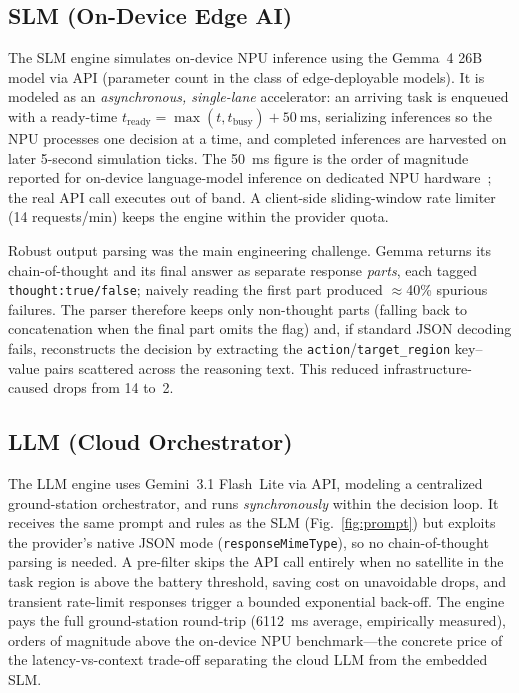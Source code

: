 \documentclass[conference,comsoc,twoside,caption=false]{IEEEtran}
\theoremstyle{definition}
\begin{document}
\subsection{SLM (On-Device Edge AI)}
The SLM engine simulates on-device NPU inference using the Gemma~4 26B model
via API (parameter count in the class of edge-deployable models). It is modeled
as an \emph{asynchronous, single-lane} accelerator: an arriving task is enqueued
with a ready-time $t_{\mathrm{ready}} = \max(t, t_{\mathrm{busy}}) + \SI{50}{\milli\second}$,
serializing inferences so the NPU processes one decision at a time, and completed
inferences are harvested on later 5-second simulation ticks. The
\SI{50}{\milli\second} figure is the order of magnitude reported for on-device
language-model inference on dedicated NPU hardware~\cite{wang2025}; the real API
call executes out of band. A client-side sliding-window rate limiter (14
requests/min) keeps the engine within the provider quota.

Robust output parsing was the main engineering challenge. Gemma returns its
chain-of-thought and its final answer as separate response \emph{parts}, each
tagged \texttt{thought:true/false}; naively reading the first part produced
$\approx$40\% spurious failures. The parser therefore keeps only non-thought
parts (falling back to concatenation when the final part omits the flag) and, if
standard JSON decoding fails, reconstructs the decision by extracting the
\texttt{action}/\texttt{target\_region} key--value pairs scattered across the
reasoning text. This reduced infrastructure-caused drops from 14 to~2.

\subsection{LLM (Cloud Orchestrator)}
The LLM engine uses Gemini~3.1 Flash~Lite via API, modeling a centralized
ground-station orchestrator, and runs \emph{synchronously} within the decision
loop. It receives the same prompt and rules as the SLM (Fig.~\ref{fig:prompt})
but exploits the provider's native JSON mode (\texttt{responseMimeType}), so no
chain-of-thought parsing is needed. A pre-filter skips the API call entirely
when no satellite in the task region is above the battery threshold, saving cost
on unavoidable drops, and transient rate-limit responses trigger a bounded
exponential back-off. The engine pays the full ground-station round-trip
(\SI{6112}{\milli\second} average, empirically measured), orders of magnitude
above the on-device NPU benchmark---the concrete price of the latency-vs-context
trade-off separating the cloud LLM from the embedded SLM.
\end{document}
